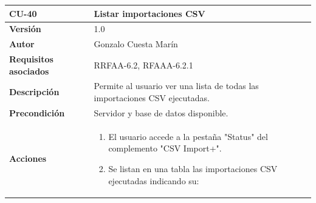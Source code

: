 \documentclass[
]{article}
\providecommand{\tightlist}{%
  \setlength{\itemsep}{0pt}\setlength{\parskip}{0pt}}
\begin{document}
\begin{longtable}[]{@{}ll@{}}
\toprule
\begin{minipage}[b]{0.19\columnwidth}\raggedright
\textbf{CU-40}\strut
\end{minipage} & \begin{minipage}[b]{0.75\columnwidth}\raggedright
\textbf{Listar importaciones CSV}\strut
\end{minipage}\tabularnewline
\midrule
\endhead
\begin{minipage}[t]{0.19\columnwidth}\raggedright
\textbf{Versión}\strut
\end{minipage} & \begin{minipage}[t]{0.75\columnwidth}\raggedright
1.0\strut
\end{minipage}\tabularnewline
\begin{minipage}[t]{0.19\columnwidth}\raggedright
\textbf{Autor}\strut
\end{minipage} & \begin{minipage}[t]{0.75\columnwidth}\raggedright
Gonzalo Cuesta Marín\strut
\end{minipage}\tabularnewline
\begin{minipage}[t]{0.19\columnwidth}\raggedright
\textbf{Requisitos asociados}\strut
\end{minipage} & \begin{minipage}[t]{0.75\columnwidth}\raggedright
RRFAA-6.2, RFAAA-6.2.1\strut
\end{minipage}\tabularnewline
\begin{minipage}[t]{0.19\columnwidth}\raggedright
\textbf{Descripción}\strut
\end{minipage} & \begin{minipage}[t]{0.75\columnwidth}\raggedright
Permite al usuario ver una lista de todas las importaciones CSV
ejecutadas.\strut
\end{minipage}\tabularnewline
\begin{minipage}[t]{0.19\columnwidth}\raggedright
\textbf{Precondición}\strut
\end{minipage} & \begin{minipage}[t]{0.75\columnwidth}\raggedright
Servidor y base de datos disponible.\strut
\end{minipage}\tabularnewline
\begin{minipage}[t]{0.19\columnwidth}\raggedright
\textbf{Acciones}\strut
\end{minipage} & \begin{minipage}[t]{0.75\columnwidth}\raggedright
\begin{enumerate}
\def\labelenumi{\arabic{enumi}.}
\tightlist
\item
  El usuario accede a la pestaña "Status" del complemento "CSV Import+".
\item
  Se listan en una tabla las importaciones CSV ejecutadas indicando su:


\end{enumerate}
\end{minipage}
\end{longtable}
\end{document}
